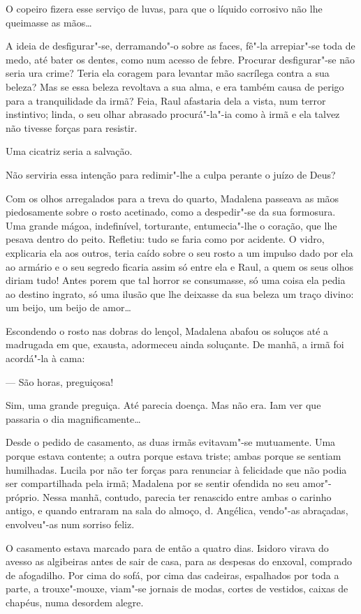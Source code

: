 O copeiro fizera esse serviço de luvas, para que o líquido corrosivo não
lhe queimasse as mãos\ldots{}

A ideia de desfigurar"-se, derramando"-o sobre as faces, fê"-la arrepiar"-se
toda de medo, até bater os dentes, como num acesso de febre. Procurar
desfigurar"-se não seria ura crime? Teria ela coragem para levantar mão
sacrílega contra a sua beleza? Mas se essa beleza revoltava a sua alma,
e era também causa de perigo para a tranquilidade da irmã? Feia, Raul
afastaria dela a vista, num terror instintivo; linda, o seu olhar
abrasado procurá"-la"-ia como à irmã e ela talvez não tivesse forças para
resistir.

Uma cicatriz seria a salvação.

Não serviria essa intenção para redimir"-lhe a culpa perante o juízo de
Deus?

Com os olhos arregalados para a treva do quarto, Madalena passeava as
mãos piedosamente sobre o rosto acetinado, como a despedir"-se da sua
formosura. Uma grande mágoa, indefinível, torturante, entumecia"-lhe o
coração, que lhe pesava dentro do peito. Refletiu: tudo se faria como
por acidente. O vidro, explicaria ela aos outros, teria caído sobre o
seu rosto a um impulso dado por ela ao armário e o seu segredo ficaria
assim só entre ela e Raul, a quem os seus olhos diriam tudo! Antes porem
que tal horror se consumasse, só uma coisa ela pedia ao destino ingrato,
só uma ilusão que lhe deixasse da sua beleza um traço divino: um beijo,
um beijo de amor\ldots{}

Escondendo o rosto nas dobras do lençol, Madalena abafou os soluços até
a madrugada em que, exausta, adormeceu ainda soluçante. De manhã, a irmã
foi acordá"-la à cama:

--- São horas, preguiçosa!

Sim, uma grande preguiça. Até parecia doença. Mas não era. Iam ver que
passaria o dia magnificamente\ldots{}

Desde o pedido de casamento, as duas irmãs evitavam"-se mutuamente. Uma
porque estava contente; a outra porque estava triste; ambas porque se
sentiam humilhadas. Lucila por não ter forças para renunciar à
felicidade que não podia ser compartilhada pela irmã; Madalena por se
sentir ofendida no seu amor"-próprio. Nessa manhã, contudo, parecia ter
renascido entre ambas o carinho antigo, e quando entraram na sala do
almoço, d. Angélica, vendo"-as abraçadas, envolveu"-as num sorriso feliz.

O casamento estava marcado para de então a quatro dias. Isidoro virava
do avesso as algibeiras antes de sair de casa, para as despesas do
enxoval, comprado de afogadilho. Por cima do sofá, por cima das
cadeiras, espalhados por toda a parte, a trouxe"-mouxe, viam"-se jornais
de modas, cortes de vestidos, caixas de chapéus, numa desordem alegre.

